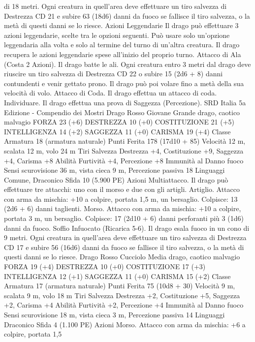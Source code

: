 \begin{multicols}{2}
di 18 metri. Ogni creatura in quell’area deve effettuare un tiro
salvezza di Destrezza CD 21 e subire 63 (18d6) danni da fuoco
se fallisce il tiro salvezza, o la metà di questi danni se lo riesce.
Azioni Leggendarie
Il drago può effettuare 3 azioni leggendarie, scelte tra le opzioni
seguenti. Può usare solo un’opzione leggendaria alla volta e solo
al termine del turno di un’altra creatura. Il drago recupera le
azioni leggendarie spese all’inizio del proprio turno.
Attacco di Ala (Costa 2 Azioni). Il drago batte le ali. Ogni
creatura entro 3 metri dal drago deve riuscire un tiro salvezza di
Destrezza CD 22 o subire 15 (2d6 + 8) danni contundenti e venir
gettato prono. Il drago può poi volare fino a metà della sua
velocità di volo.
Attacco di Coda. Il drago effettua un attacco di coda.
Individuare. Il drago effettua una prova di Saggezza
(Percezione).
SRD Italia 5a Edizione - Compendio dei Mostri
Drago Rosso Giovane
Grande drago, caotico malvagio
FORZA 23 (+6)
DESTREZZA 10 (+0)
COSTITUZIONE 21 (+5)
INTELLIGENZA 14 (+2)
SAGGEZZA 11 (+0)
CARISMA 19 (+4)
Classe Armatura 18 (armatura naturale)
Punti Ferita 178 (17d10 + 85)
Velocità 12 m, scalata 12 m, volo 24 m
Tiri Salvezza Destrezza +4, Costituzione +9, Saggezza +4,
Carisma +8
Abilità Furtività +4, Percezione +8
Immunità al Danno fuoco
Sensi scurovisione 36 m, vista cieca 9 m, Percezione passiva 18
Linguaggi Comune, Draconico
Sfida 10 (5.900 PE)
Azioni
Multiattacco. Il drago può effettuare tre attacchi: uno con il
morso e due con gli artigli.
Artiglio. Attacco con arma da mischia: +10 a colpire, portata 1,5
m, un bersaglio.
Colpisce: 13 (2d6 + 6) danni taglienti.
Morso. Attacco con arma da mischia: +10 a colpire, portata 3 m,
un bersaglio.
Colpisce: 17 (2d10 + 6) danni perforanti più 3 (1d6) danni da
fuoco.
Soffio Infuocato (Ricarica 5-6). Il drago esala fuoco in un cono
di 9 metri. Ogni creatura in quell’area deve effettuare un tiro
salvezza di Destrezza CD 17 e subire 56 (16d6) danni da fuoco
se fallisce il tiro salvezza, o la metà di questi danni se lo riesce.
Drago Rosso Cucciolo
Media drago, caotico malvagio
FORZA 19 (+4)
DESTREZZA 10 (+0)
COSTITUZIONE 17 (+3)
INTELLIGENZA 12 (+1)
SAGGEZZA 11 (+0)
CARISMA 15 (+2)
Classe Armatura 17 (armatura naturale)
Punti Ferita 75 (10d8 + 30)
Velocità 9 m, scalata 9 m, volo 18 m
Tiri Salvezza Destrezza +2, Costituzione +5, Saggezza +2,
Carisma +4
Abilità Furtività +2, Percezione +4
Immunità al Danno fuoco
Sensi scurovisione 18 m, vista cieca 3 m, Percezione passiva 14
Linguaggi Draconico
Sfida 4 (1.100 PE)
Azioni
Morso. Attacco con arma da mischia: +6 a colpire, portata 1,5

\end{multicols}
